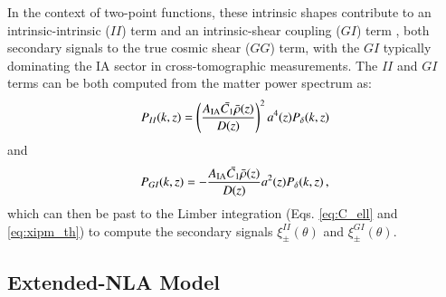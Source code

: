 In the context of two-point functions, these intrinsic shapes contribute to an intrinsic-intrinsic ($II$) term and an intrinsic-shear coupling ($GI$) term \citep{Hirata2004}, both secondary signals to the true cosmic shear ($GG$) term, with the $GI$ typically dominating the IA sector in cross-tomographic measurements. 
The $II$ and $GI$ terms  can be both computed from the matter power spectrum as: 
 \begin{eqnarray}
P_{II}(k,z) =  \left(\frac{A_{\rm IA}\bar{C_1}\bar{\rho}(z)}{D(z)}\right)^2a^4(z) P_{\delta}(k,z)
\label{eq:Pk_II_th}
\end{eqnarray}
and
\begin{eqnarray}
P_{GI}(k,z) = - \frac{A_{\rm IA}\bar{C_1}\bar{\rho}(z)}{D(z)}a^2(z) P_{\delta}(k,z) \, ,
\label{eq:Pk_GI_th}
\end{eqnarray}
which can then be past to the Limber integration (Eqs. \ref{eq:C_ell} and \ref{eq:xipm_th}) to compute  the secondary signals $\xi_{\pm}^{II}(\theta)$ and $\xi_{\pm}^{GI}(\theta)$. 


\subsection{Extended-NLA Model}
\label{subsec:IA_th_extNLA}




